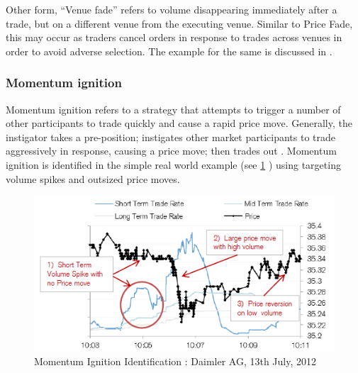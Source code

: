 \documentclass[12pt,a4paper]{article}
\numberwithin{equation}{section}
\numberwithin{figure}{section}
\numberwithin{table}{section}
\begin{document}
Other form, “Venue fade” refers to volume disappearing immediately after a trade, but on a different venue from the executing venue. Similar to Price Fade, this may occur as traders cancel orders in response to trades across venues in order to avoid adverse selection. The example for the same is discussed in \citet{AES2012II}.

\subsubsection{Momentum ignition}
Momentum ignition refers to a strategy that attempts to trigger a number of other participants to trade quickly and cause a rapid price move. Generally, the instigator takes a pre-position; instigates other market participants to trade aggressively in response, causing a price move; then trades out \citep{AES2012II}. Momentum ignition is identified in the simple real world example (see \ref{fig:MI} ) using targeting volume spikes and outsized price moves. 

\begin{figure}[ht]
\begin{center}
\includegraphics[width=\textwidth]{MI}
\caption{Momentum Ignition Identification : Daimler AG, 13th July, 2012 \citep{AES2012II}}
\label{fig:MI}
\end{center}
\end{figure}
\end{document}
